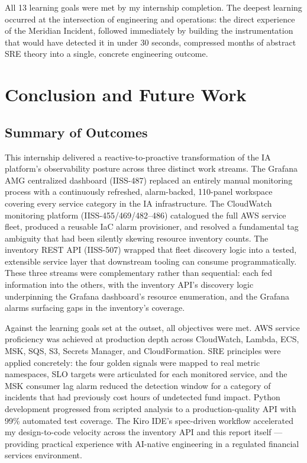 All 13 learning goals were met by my internship completion. The deepest
learning occurred at the intersection of engineering and operations:
the direct experience of the Meridian Incident, followed
immediately by building the instrumentation that would have detected
it in under 30 seconds, compressed months of abstract SRE theory
into a single, concrete engineering outcome.

\section{Conclusion and Future Work}
\label{sec:conclusion}

\subsection{Summary of Outcomes}

This internship delivered a reactive-to-proactive transformation of the IA
platform's observability posture across three distinct work streams. The
Grafana AMG centralized dashboard (IISS-487) replaced an entirely manual
monitoring process with a continuously refreshed, alarm-backed, 110-panel
workspace covering every service category in the IA infrastructure. The
CloudWatch monitoring platform (IISS-455/469/482--486) catalogued the full
AWS service fleet, produced a reusable IaC alarm provisioner, and resolved a
fundamental tag ambiguity that had been silently skewing resource inventory
counts. The inventory REST API (IISS-507) wrapped that fleet discovery logic
into a tested, extensible service layer that downstream tooling can consume
programmatically. These three streams were complementary rather than
sequential: each fed information into the others, with the inventory API's
discovery logic underpinning the Grafana dashboard's resource enumeration,
and the Grafana alarms surfacing gaps in the inventory's coverage.

Against the learning goals set at the outset, all objectives were met. AWS
service proficiency was achieved at production depth across CloudWatch,
Lambda, ECS, MSK, SQS, S3, Secrets Manager, and CloudFormation. SRE
principles were applied concretely: the four golden signals were mapped to
real metric namespaces, SLO targets were articulated for each monitored
service, and the MSK consumer lag alarm reduced the detection window for a
category of incidents that had previously cost hours of undetected fund
impact. Python development progressed from scripted analysis to a
production-quality API with 99\% automated test coverage. The Kiro IDE's
spec-driven workflow accelerated my design-to-code velocity across the inventory
API and this report itself --- providing practical experience with AI-native
engineering in a regulated financial services environment.

